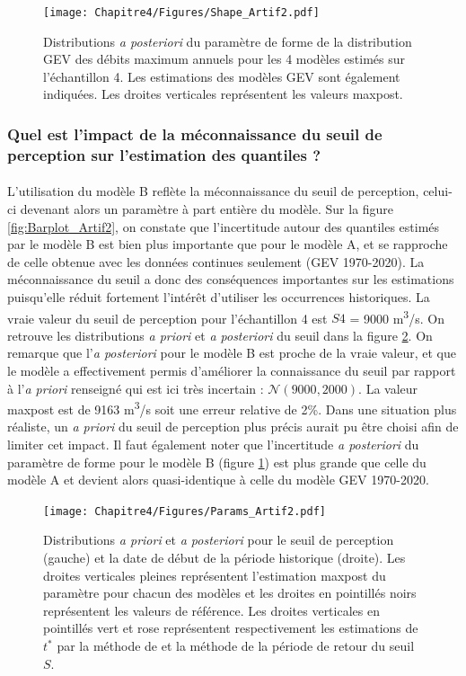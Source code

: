	\begin{figure}[h!]
		\centering
		\texttt{[image: Chapitre4/Figures/Shape\_Artif2.pdf]}	
		\caption{Distributions \textit{a posteriori} du paramètre de forme de la distribution GEV des débits maximum annuels pour les 4 modèles estimés sur l'échantillon 4. Les estimations des modèles GEV sont également indiquées. Les droites verticales représentent les valeurs maxpost.}
		\label{fig:Shape_Artif2}
	\end{figure}

	
	\subsubsection{Quel est l'impact de la méconnaissance du seuil de perception sur l'estimation des quantiles ?}
	
	\paragraph{} L'utilisation du modèle B reflète la méconnaissance du seuil de perception, celui-ci devenant alors un paramètre à part entière du modèle. Sur la figure \ref{fig:Barplot_Artif2}, on constate que l'incertitude autour des quantiles estimés par le modèle B est bien plus importante que pour le modèle A, et se rapproche de celle obtenue avec les données continues seulement (GEV 1970-2020). La méconnaissance du seuil a donc des conséquences importantes sur les estimations puisqu'elle réduit fortement l'intérêt d'utiliser les occurrences historiques. La vraie valeur du seuil de perception pour l'échantillon 4 est $S4$ = 9000 m\textsuperscript{3}/s. On retrouve les distributions \textit{a priori} et \textit{a posteriori} du seuil dans la figure \ref{fig:Params_Artif2}. On remarque que l'\textit{a posteriori} pour le modèle B est proche de la vraie valeur, et que le modèle a effectivement permis d'améliorer la connaissance du seuil par rapport à l'\textit{a priori} renseigné qui est ici très incertain : $\mathcal{N}(9000,2000)$. La valeur maxpost est de 9163 m\textsuperscript{3}/s soit une erreur relative de 2\%. Dans une situation plus réaliste, un \textit{a priori} du seuil de perception plus précis aurait pu être choisi afin de limiter cet impact. Il faut également noter que l'incertitude \textit{a posteriori} du paramètre de forme pour le modèle B (figure \ref{fig:Shape_Artif2}) est plus grande que celle du modèle A et devient alors quasi-identique à celle du modèle GEV 1970-2020. 
	
	 \begin{figure}[h!]
		\centering
		\texttt{[image: Chapitre4/Figures/Params\_Artif2.pdf]}	
		\caption{Distributions \textit{a priori} et \textit{a posteriori} pour le seuil de perception (gauche) et la date de début de la période historique (droite). Les droites verticales pleines représentent l'estimation maxpost du paramètre pour chacun des modèles et les droites en pointillés noirs représentent les valeurs de référence. Les droites verticales en pointillés vert et rose représentent respectivement les estimations de $t^{*}$ par la méthode de \citet{prosdocimi_german_2018} et la méthode de la période de retour du seuil $S$.}
		\label{fig:Params_Artif2}
	\end{figure}
	

